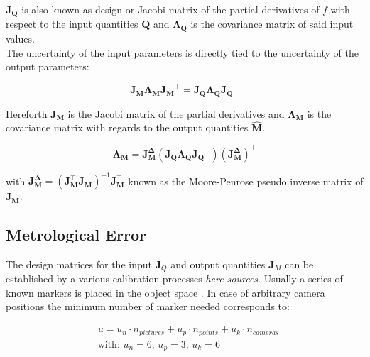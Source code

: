 \documentclass[5p,times,procedia]{elsarticle}
\begin{document}
$\mathbf{J_{Q}}$ is also known as design or Jacobi matrix of the partial derivatives of $f$ with respect to the input quantities $\mathbf{Q}$ and $\mathbf{\Lambda_Q}$ is the covariance matrix of said  input values. \\

The uncertainty of the input parameters is directly tied to the uncertainty of the output parameters:

\begin{equation}
	\mathbf{J_{M}}\mathbf{\Lambda_{M}}\mathbf{J_{M}}^{\top} = \mathbf{J_{Q}}\mathbf{\Lambda_{Q}}\mathbf{J_{Q}}^{\top}
\end{equation}

Hereforth $\mathbf{J_{M}}$ is the Jacobi matrix of the partial derivatives and $\mathbf{\Lambda_{M}}$ is the covariance matrix with regards to the output quantities $\hat{\mathbf{M}}$.

\begin{equation}
	\mathbf{\Lambda_{M}} = \mathbf{J_{M}^{\Delta}} \left( \mathbf{J_{Q}}\mathbf{\Lambda_{Q}}\mathbf{J_{Q}}^{\top}\right) \left(\mathbf{J_{M}^{\Delta}}\right)^{\top}
\end{equation}

with $ \mathbf{J_{M}^{\Delta}} = \left( \mathbf{J_{M}^{\top}} \mathbf{J_{M}^{}} \right)^{-1}\mathbf{J_{M}^{\top}}
$ known as the Moore-Penrose pseudo inverse matrix of $\mathbf{J_M}$. \\

\subsection{Metrological Error}
\label{error_estimate}

The design matrices for the input $\mathbf{J}_{Q}$ and output quantities $\mathbf{J}_{M}$ can be established by a various calibration processes \textit{here sources}. Usually a series of known markers is placed in the object space \cite{Luhmann2003}. In case of arbitrary camera positions the minimum number of marker needed corresponds to:

\begin{equation}
	\label{eqn:NumCalibPoints}
	\begin{aligned}
		& 	u = u_n \cdot n_{pictures} + u_p \cdot n_{points} + u_k \cdot n_{cameras} \\
		& \text{with: } u_n = 6\text{, } u_p = 3\text{, } u_k = 6 
	\end{aligned}
\end{equation}
\end{document}
